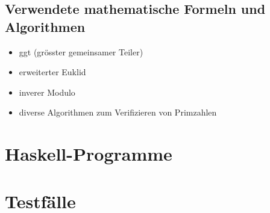 \documentclass[a4paper, 11pt]{article} %
\begin{document}
\subsection{Verwendete mathematische Formeln und Algorithmen}
\begin{itemize}
\item ggt (grösster gemeinsamer Teiler)
\item erweiterter Euklid
\item inverer Modulo
\item diverse Algorithmen zum Verifizieren von Primzahlen
\end{itemize}

\section{Haskell-Programme}


\section{Testfälle}
\end{document}
